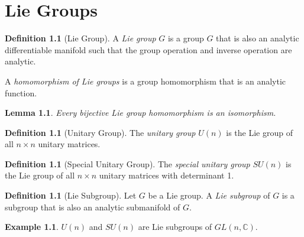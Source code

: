 \documentclass{book}
\newtheorem{lm}[prop]{Lemma}
\theoremstyle{definition}
\newtheorem{df}[prop]{Definition}
\newtheorem{ex}[prop]{Example}
\begin{document}
\chapter{Lie Groups}

\begin{df}[Lie Group]
A \emph{Lie group} $G$ is a group $G$ that is also an analytic differentiable manifold such that the group operation and inverse operation are analytic.

A \emph{homomorphism of Lie groups} is a group homomorphism that is an analytic function.
\end{df}

\begin{lm}
Every bijective Lie group homomorphism is an isomorphism.
\end{lm}


\begin{df}[Unitary Group]
The \emph{unitary group} $U(n)$ is the Lie group of all $n \times n$ unitary matrices.
\end{df}

\begin{df}[Special Unitary Group]
The \emph{special unitary group} $SU(n)$ is the Lie group of all $n \times n$ unitary matrices with determinant 1.
\end{df}

\begin{df}[Lie Subgroup]
Let $G$ be a Lie group. A \emph{Lie subgroup} of $G$ is a subgroup that is also an analytic submanifold of $G$.
\end{df}

\begin{ex}
$U(n)$ and $SU(n)$ are Lie subgroups of $GL(n, \mathbb{C})$.
\end{ex}
\end{document}
